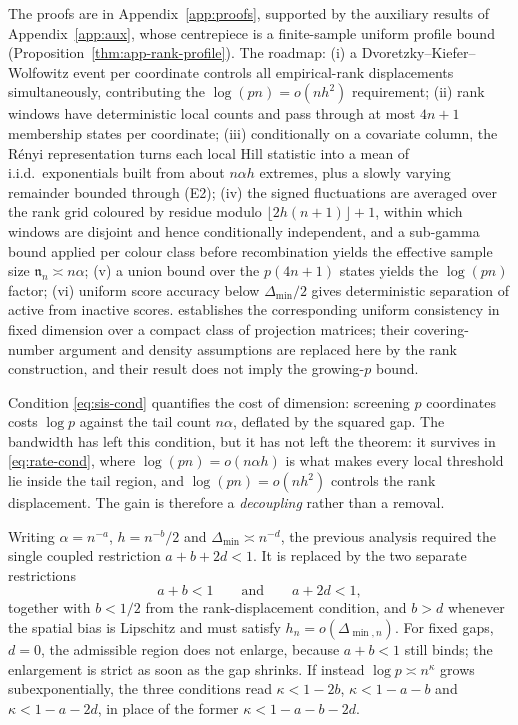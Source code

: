 The proofs are in Appendix~\ref{app:proofs}, supported by the auxiliary
results of Appendix~\ref{app:aux}, whose centrepiece is a finite-sample
uniform profile bound (Proposition~\ref{thm:app-rank-profile}). The
roadmap: (i) a Dvoretzky--Kiefer--Wolfowitz event per coordinate controls
all empirical-rank displacements simultaneously, contributing the
$\log(pn)=o(nh^2)$ requirement; (ii) rank windows have deterministic
local counts and pass through at most $4n+1$ membership states per
coordinate; (iii) conditionally on a covariate column, the R\'enyi
representation turns each local Hill statistic into a mean of
i.i.d.\ exponentials built from about $n\alpha h$ extremes, plus a
slowly varying remainder bounded through (E2); (iv) the signed
fluctuations are averaged over the rank grid coloured by residue modulo
$\lfloor2h(n+1)\rfloor+1$, within which windows are disjoint and hence
conditionally independent, and a sub-gamma bound applied per colour
class before recombination yields the effective sample size
$\mathfrak n_n\asymp n\alpha$; (v) a union bound over
the $p(4n+1)$ states yields the $\log(pn)$ factor; (vi) uniform score
accuracy below $\Delta_{\min}/2$ gives deterministic separation of
active from inactive scores. \citet[Theorem~3]{gardesPodgorny2025}
establishes the corresponding uniform consistency in fixed dimension
over a compact class of projection matrices; their covering-number
argument and density assumptions are replaced here by the rank
construction, and their result does not imply the growing-$p$ bound.

Condition \eqref{eq:sis-cond} quantifies the cost of dimension:
screening $p$ coordinates costs $\log p$ against the tail count
$n\alpha$, deflated by the squared gap. The bandwidth has left this
condition, but it has not left the theorem: it survives in
\eqref{eq:rate-cond}, where $\log(pn)=o(n\alpha h)$ is what makes every
local threshold lie inside the tail region, and $\log(pn)=o(nh^2)$
controls the rank displacement. The gain is therefore a
\emph{decoupling} rather than a removal.

Writing $\alpha=n^{-a}$, $h=n^{-b}/2$ and $\Delta_{\min}\asymp n^{-d}$,
the previous analysis required the single coupled restriction
$a+b+2d<1$. It is replaced by the two separate restrictions
\[
 a+b<1
 \qquad\text{and}\qquad
 a+2d<1,
\]
together with $b<1/2$ from the rank-displacement condition, and $b>d$
whenever the spatial bias is Lipschitz and must satisfy
$h_n=o(\Delta_{\min,n})$. For fixed gaps, $d=0$, the admissible region
does not enlarge, because $a+b<1$ still binds; the enlargement is strict
as soon as the gap shrinks. If instead $\log p\asymp n^\kappa$ grows
subexponentially, the three conditions read $\kappa<1-2b$,
$\kappa<1-a-b$ and $\kappa<1-a-2d$, in place of the former
$\kappa<1-a-b-2d$.

